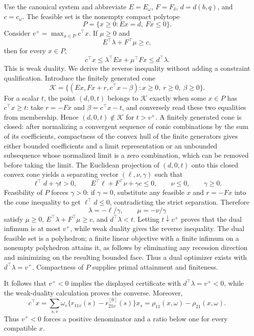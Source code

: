 Use the canonical system and abbreviate \(E=E_\omega\), \(F=F_\delta\), \(d=d(b,q)\), and \(c=c_\omega\).  The feasible set is the nonempty compact polytope
\[
P=\{x\geq0:Ex=d,\ Fx\leq0\}.
\]
Consider \(v^+=\max_{x\in P}c^\top x\).  If \(\mu\geq0\) and
\[
E^\top\lambda+F^\top\mu\geq c,
\]
then for every \(x\in P\),
\[
c^\top x\leq\lambda^\top Ex+\mu^\top Fx
\leq d^\top\lambda.
\]
This is weak duality.  We derive the reverse inequality without adding a constraint qualification.  Introduce the finitely generated cone
\[
\mathcal K=\{(Ex,Fx+r,c^\top x-\beta):x\geq0,\ r\geq0,\ \beta\geq0\}.
\]
For a scalar \(t\), the point \((d,0,t)\) belongs to \(\mathcal K\) exactly when some \(x\in P\) has \(c^\top x\geq t\): take \(r=-Fx\) and \(\beta=c^\top x-t\), and conversely read these two equalities from membership.  Hence \((d,0,t)\notin\mathcal K\) for \(t>v^+\).  A finitely generated cone is closed: after normalizing a convergent sequence of conic combinations by the sum of its coefficients, compactness of the convex hull of the finite generators gives either bounded coefficients and a limit representation or an unbounded subsequence whose normalized limit is a zero combination, which can be removed before taking the limit.  The Euclidean projection of \((d,0,t)\) onto this closed convex cone yields a separating vector \((\ell,\nu,\gamma)\) such that
\[
\ell^\top d+\gamma t>0,\qquad
E^\top\ell+F^\top\nu+\gamma c\leq0,\qquad
\nu\leq0,\qquad\gamma\geq0.
\]
Feasibility of \(P\) forces \(\gamma>0\): if \(\gamma=0\), substitute any feasible \(x\) and \(r=-Fx\) into the cone inequality to get \(\ell^\top d\leq0\), contradicting the strict separation.  Therefore
\[
\lambda=-\ell/\gamma,\qquad \mu=-\nu/\gamma
\]
satisfy \(\mu\geq0\), \(E^\top\lambda+F^\top\mu\geq c\), and \(d^\top\lambda<t\).  Letting \(t\downarrow v^+\) proves that the dual infimum is at most \(v^+\), while weak duality gives the reverse inequality.  The dual feasible set is a polyhedron; a finite linear objective with a finite infimum on a nonempty polyhedron attains it, as follows by eliminating any recession direction and minimizing on the resulting bounded face.  Thus a dual optimizer exists with \(d^\top\lambda=v^+\).  Compactness of \(P\) supplies primal attainment and finiteness.

It follows that \(v^+<0\) implies the displayed certificate with \(d^\top\lambda=v^+<0\), while the weak-duality calculation proves the converse.  Moreover,
\[
c^\top x=\sum_{s,v}\omega_v\{r_{11v}(s)-r^{[0]}_{21v}(s)\}x_s
=\rho_{11}(x,\omega)-\rho_{21}(x,\omega).
\]
Thus \(v^+<0\) forces a positive denominator and a ratio below one for every compatible \(x\).

